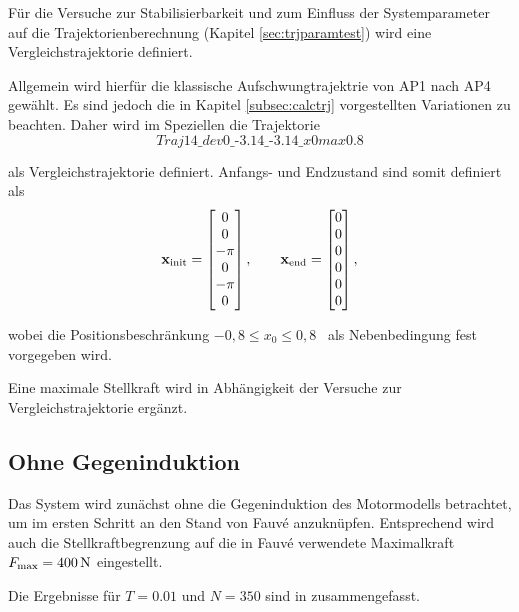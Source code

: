Für die Versuche zur Stabilisierbarkeit und zum Einfluss der Systemparameter auf die Trajektorienberechnung (Kapitel \ref{sec:trjparamtest}) wird eine Vergleichstrajektorie definiert.

Allgemein wird hierfür die klassische Aufschwungtrajektrie von AP1 nach AP4 gewählt. Es sind jedoch die in Kapitel \ref{subsec:calctrj} vorgestellten Variationen zu beachten. Daher wird im Speziellen die Trajektorie
\[
	\textit{Traj14\_dev0\_-3.14\_-3.14\_x0max0.8}
\]

als Vergleichstrajektorie definiert. 
Anfangs- und Endzustand sind somit definiert als
\begin{align*}
	\boldsymbol{\mathrm{x}}_{\mathrm{init}} =
	\begin{bmatrix}
		0 \\ 0 \\ -\pi \\ 0 \\ -\pi \\ 0
	\end{bmatrix}	, \qquad
	\boldsymbol{\mathrm{x}}_{\mathrm{end}} =
	\begin{bmatrix}
		0 \\ 0 \\ 0 \\ 0 \\ 0 \\ 0
	\end{bmatrix} ,
\end{align*}


wobei die Positionsbeschränkung $-0,8 \leq x_0 \leq 0,8$ \ als Nebenbedingung fest vorgegeben wird.

Eine maximale Stellkraft wird in Abhängigkeit der Versuche zur Vergleichstrajektorie ergänzt.


\subsection{Ohne Gegeninduktion}\label{subsec:ohneInd}

Das System wird zunächst ohne die Gegeninduktion des Motormodells betrachtet, um im ersten Schritt an den Stand von Fauvé \cite{fauve} anzuknüpfen. Entsprechend wird auch die Stellkraftbegrenzung auf die in Fauvé \cite{fauve} verwendete Maximalkraft $F_{\mathrm{max}}=400\,\mathrm{N}$ eingestellt. 

Die Ergebnisse für $T=0.01$ und $N=350$ sind in  zusammengefasst.

